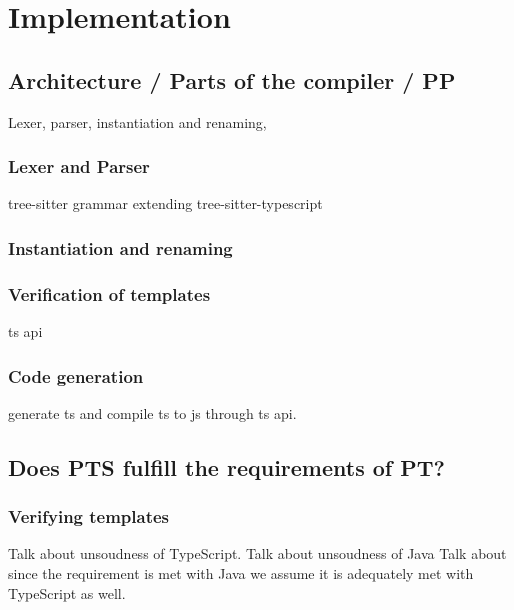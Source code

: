 
\chapter{Implementation}\label{ch:implementation}

\section{Architecture / Parts of the compiler / PP}\label{sec:architecture}

Lexer, parser, instantiation and renaming,

\subsection{Lexer and Parser}\label{sec:lexer-and-parser}

tree-sitter grammar extending tree-sitter-typescript

\subsection{Instantiation and renaming}\label{sec:instantiation-and-renaming}


\subsection{Verification of templates}\label{sec:verification-of-templates}

ts api

\subsection{Code generation}\label{sec:code-generation}

generate ts and compile ts to js through ts api.

\section{Does PTS fulfill the requirements of PT?}\label{sec:does-pts-fulfill-the-requirements-of-pt?}

\subsection{Verifying templates}\label{subsec:pt-requirements-verifying-templates}

Talk about unsoudness of TypeScript.
Talk about unsoudness of Java \cite{java-unsound}
Talk about since the requirement is met with Java we assume it is adequately met with TypeScript as well.